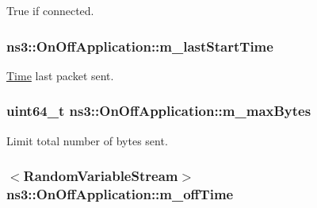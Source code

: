 True if connected. 

\subsubsection[{\texorpdfstring{m\+\_\+last\+Start\+Time}{m_lastStartTime}}]{ ns3\+::\+On\+Off\+Application\+::m\+\_\+last\+Start\+Time\hspace{0.3cm}{\ttfamily [private]}}\hypertarget{classns3_1_1OnOffApplication_aa61765b68f90bebda8867638e25eb9ff}{}\label{classns3_1_1OnOffApplication_aa61765b68f90bebda8867638e25eb9ff}


\hyperlink{classns3_1_1Time}{Time} last packet sent. 

\subsubsection[{\texorpdfstring{m\+\_\+max\+Bytes}{m_maxBytes}}]{\setlength{\rightskip}{0pt plus 5cm}uint64\+\_\+t ns3\+::\+On\+Off\+Application\+::m\+\_\+max\+Bytes\hspace{0.3cm}{\ttfamily [private]}}\hypertarget{classns3_1_1OnOffApplication_a91d36bea04deb7139344300a2a9f9482}{}\label{classns3_1_1OnOffApplication_a91d36bea04deb7139344300a2a9f9482}


Limit total number of bytes sent. 

\subsubsection[{\texorpdfstring{m\+\_\+off\+Time}{m_offTime}}]{$<${\bf Random\+Variable\+Stream}$>$ ns3\+::\+On\+Off\+Application\+::m\+\_\+off\+Time\hspace{0.3cm}{\ttfamily [private]}}\hypertarget{classns3_1_1OnOffApplication_a3af5f592828037a47f079bb97bb05654}{}\label{classns3_1_1OnOffApplication_a3af5f592828037a47f079bb97bb05654}


